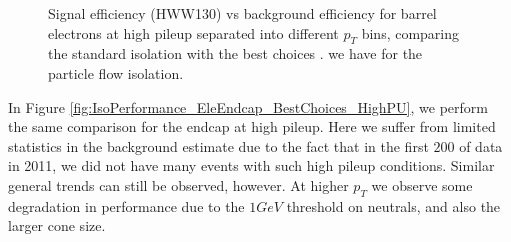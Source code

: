 \begin{figure}[!htbp]
\begin{center}
\caption{Signal efficiency (HWW130) vs background efficiency for barrel electrons at high pileup
separated into different $p_{T}$ bins, comparing the standard isolation with the best choices .
we have for the particle flow isolation.}
\label{fig:IsoPerformance_EleBarrel_BestChoices_HighPU}
\end{center}
\end{figure}

\clearpage

In Figure \ref{fig:IsoPerformance_EleEndcap_BestChoices_HighPU}, we perform the same comparison for
the endcap at high pileup. Here we suffer from limited statistics in the background estimate
due to the fact that in the first $200$ \ipb of data in 2011, we did not have many events with
such high pileup conditions. Similar general trends can still be observed, however. At higher
$p_{T}$ we observe some degradation in performance due to the $1GeV$ threshold on neutrals, 
and also the larger cone size. 

